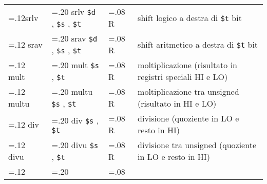\documentclass{standalone}
\newcommand\lightrule{%
	\arrayrulecolor{black!30}%
	\midrule[\lightrulewidth]%
	\arrayrulecolor{black}}
\newcommand\register[1]{%
	\texttt{#1}%
}
\begin{document}
\begin{tabularx}{\textwidth}{ >{\hsize=.12\textwidth}X >{\hsize=.20\textwidth}X >{\hsize=.08\textwidth}X X }
		srlv & srlv \register{\$d}, \register{\$s}, \register{\$t} & R & shift logico a destra di \register{\$t} bit \\\lightrule
		srav & srav \register{\$d}, \register{\$s}, \register{\$t} & R & shift aritmetico a destra di \register{\$t} bit \\\lightrule
		mult & mult \register{\$s}, \register{\$t} & R & moltiplicazione (risultato in registri speciali HI e LO) \\\lightrule
		multu & multu \register{\$s}, \register{\$t} & R & moltiplicazione tra unsigned (risultato in HI e LO) \\\lightrule
		div & div \register{\$s}, \register{\$t} & R & divisione (quoziente in LO e resto in HI) \\\lightrule
		divu & divu \register{\$s}, \register{\$t} & R & divisione tra unsigned (quoziente in LO e resto in HI) \\\lightrule
	\bottomrule
\end{tabularx}
\end{document}

